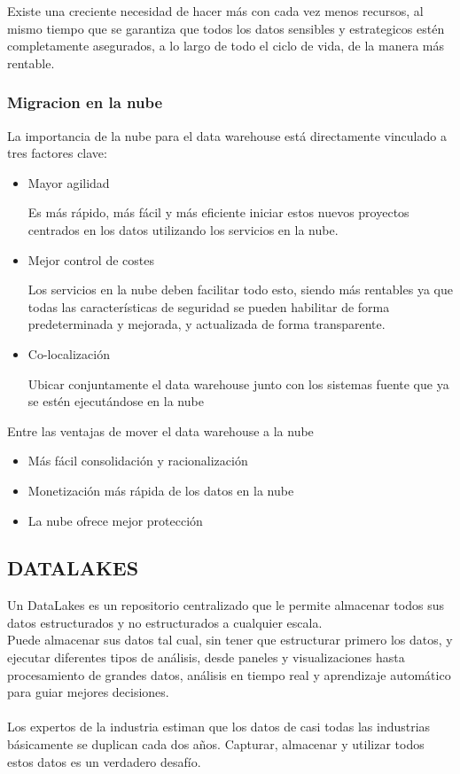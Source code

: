 \documentclass[%
 reprint,
 amsmath,amssymb,
 aps,
]{revtex4-1}
\begin{document}
Existe una creciente necesidad de hacer más con cada vez menos recursos, al mismo tiempo que se garantiza que todos los datos sensibles y estrategicos estén completamente asegurados, a lo largo de todo el ciclo de vida, de la manera más rentable.\cite{referenciarobles1}
	

\subsubsection{\textbf{Migracion en la nube}}

La importancia de la nube para el data warehouse está directamente vinculado a tres factores clave:

\begin{itemize}
	\item Mayor agilidad

Es más rápido, más fácil y más eficiente iniciar estos nuevos proyectos centrados en los datos utilizando los servicios en la nube.

	\item Mejor control de costes

Los servicios en la nube deben facilitar todo esto, siendo más rentables ya que todas las características de seguridad se pueden habilitar de forma predeterminada y mejorada, y actualizada de forma transparente.

	\item Co-localización

Ubicar conjuntamente el data warehouse junto con los sistemas fuente que ya se estén ejecutándose en la nube
\end{itemize}
\newpage
Entre las ventajas de mover el data warehouse a la nube

\begin{itemize}
	\item Más fácil consolidación y racionalización
	\item Monetización más rápida de los datos en la nube
	\item La nube ofrece mejor protección \cite{referenciarobles2}
\end{itemize}


\subsection{DATALAKES}	

Un DataLakes es un repositorio centralizado que le permite almacenar todos sus datos estructurados y no estructurados a cualquier escala. \cite{referenciasosa1}
\\ Puede almacenar sus datos tal cual, sin tener que estructurar primero los datos, y ejecutar diferentes tipos de análisis, desde paneles y visualizaciones hasta procesamiento de grandes datos, análisis en tiempo real y aprendizaje automático para guiar mejores decisiones.
\\\\
Los expertos de la industria estiman que los datos de casi todas las industrias básicamente se duplican cada dos años. Capturar, almacenar y utilizar todos estos datos es un verdadero desafío. \\
\end{document}

